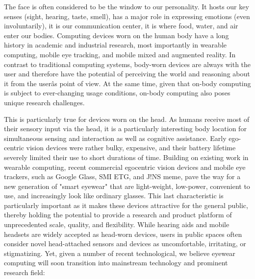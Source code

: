 \documentclass{sigchi-ext}
\begin{document}
The face is often considered to be the window to our personality. It hosts our key senses (sight, hearing, taste, smell), has a major role in expressing emotions (even involuntarily), it is our communication center, it is where food, water, and air enter our bodies.  
Computing devices worn on the human body have a long history in academic and industrial research, most importantly in wearable computing, mobile eye tracking, and mobile mixed and augmented reality.  In contrast to traditional computing systems, body-worn devices are always with the user and therefore have the potential of perceiving the world and reasoning about it from the userâs point of view. At the same time, given that on-body computing is subject to ever-changing usage conditions, on-body computing also poses unique research challenges. 

This is particularly true for devices worn on the head. As humans receive most of their sensory input via the head, it is a particularly interesting body location for simultaneous sensing and interaction as well as cognitive assistance. Early ego- centric vision devices were rather bulky, expensive, and their battery lifetime severely limited their use to short durations of time\cite{cakmakci2006head}. Building on existing work in wearable computing, recent commercial egocentric vision devices and mobile eye trackers, such as Google Glass, SMI ETG, and J!NS meme, pave the way for a new generation of "smart eyewear" that are light-weight, low-power, convenient to use, and increasingly look like ordinary glasses\cite{bulling2014cognition,kliegl2006tracking}. This last characteristic is particularly important as it makes these devices attractive for the general public, thereby holding the potential to provide a research and product platform of unprecedented scale, quality, and flexibility.
While hearing aids and mobile headsets are widely accepted as head-worn devices, users in public spaces often consider novel head-attached sensors and devices as uncomfortable, irritating, or stigmatizing. Yet, given a number of recent technological, we believe eyewear computing will soon transition into mainstream technology and prominent research field:
\end{document}
